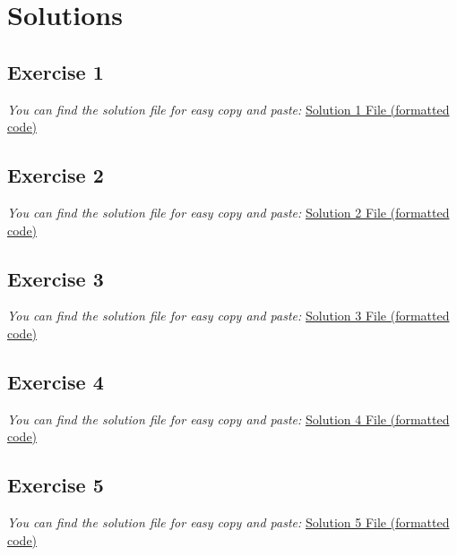 \section{Solutions}

\subsection{Exercise 1}
\textit{You can find the solution file for easy copy and paste:} \href{https://github.com/elRaulito/eUTxO-Fundamentals-Building-Cardano-Smart-Contracts/blob/main/eBook/sections/solutions/index.html}{Solution 1 File (formatted code)}


\subsection{Exercise 2}
\textit{You can find the solution file for easy copy and paste:} \href{https://github.com/elRaulito/eUTxO-Fundamentals-Building-Cardano-Smart-Contracts/blob/main/eBook/sections/solutions/get_addresses.py}{Solution 2 File (formatted code)}


\subsection{Exercise 3}
\textit{You can find the solution file for easy copy and paste:} \href{https://github.com/elRaulito/eUTxO-Fundamentals-Building-Cardano-Smart-Contracts/blob/main/eBook/sections/solutions/nft.ak}{Solution 3 File (formatted code)}


\subsection{Exercise 4}
\textit{You can find the solution file for easy copy and paste:} \href{https://github.com/elRaulito/eUTxO-Fundamentals-Building-Cardano-Smart-Contracts/blob/main/eBook/sections/solutions/cip69.ak}{Solution 4 File (formatted code)}


\subsection{Exercise 5}
\textit{You can find the solution file for easy copy and paste:} \href{https://github.com/elRaulito/eUTxO-Fundamentals-Building-Cardano-Smart-Contracts/blob/main/eBook/sections/solutions/fraction.ak}{Solution 5 File (formatted code)}

